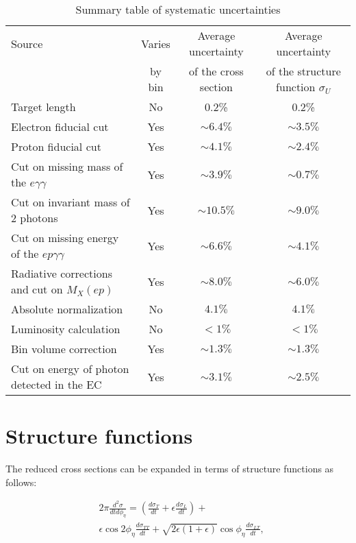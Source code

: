 \documentclass[prc,aps,floatfix,showpacs,showkeys,twocolumn,superscriptaddress,letterpaper,10pt]{revtex4-1}
\begin{document}
\begingroup
\squeezetable
\begin{table*}
\caption{Summary table of systematic uncertainties}
\centering
\begin{ruledtabular}
\begin{tabular}{lccc}
Source & Varies  & Average uncertainty & Average uncertainty   \\
                                 & by bin  & of the cross section  & of the structure function $\sigma_U$ \\
\hline
Target length & No & 0.2\% & 0.2\% \\
Electron fiducial cut & Yes &$\sim  6.4\%$ &$\sim  3.5\%$  \\
Proton fiducial cut & Yes &$\sim  4.1\%$ &$\sim  2.4\%$  \\
Cut on missing mass of the $e\gamma\gamma$ & Yes & $\sim3.9\%$ & $\sim0.7\%$\\
Cut on invariant mass of 2 photons & Yes & $\sim10.5\%$ & $\sim 9.0\%$ \\
Cut on missing energy of the $ep\gamma\gamma$ & Yes & $\sim 6.6\%$ & $\sim 4.1\%$ \\
Radiative corrections and cut on $M_X(ep)$ & Yes & $\sim 8.0\%$ &  $\sim 6.0\%$ \\
Absolute normalization & No & $4.1\%$ & $4.1\%$ \\
Luminosity calculation & No & $ < 1\%$ & $ < 1\%$ \\
Bin volume correction      & Yes& $\sim 1.3\%$ & $\sim 1.3\%$ \\
Cut on energy of photon detected in the EC & Yes & $\sim 3.1\%$& $\sim 2.5\%$ \\
\end{tabular}
\end{ruledtabular}
\label{table:syst-summary}
\end{table*} 
\endgroup




\section{Structure functions  }
The reduced cross sections can be expanded in terms of  structure functions as follows:

\begin{equation}
\begin{split}
&2\pi\frac{d^2\sigma}{dtd\phi_\eta} 
=\left( \frac{d\sigma_T}{dt}+\epsilon\frac{d\sigma_L}{dt}\right)+\\
&\epsilon \cos 2 \phi_\eta\frac{d\sigma_{TT}}{dt}
+ \sqrt{2\epsilon(1+\epsilon)}\cos \phi_\eta \frac{d\sigma_{LT}}{dt}, 
\end{split}
\label{eq:sigmaphidep}
\end{equation}
\end{document}
